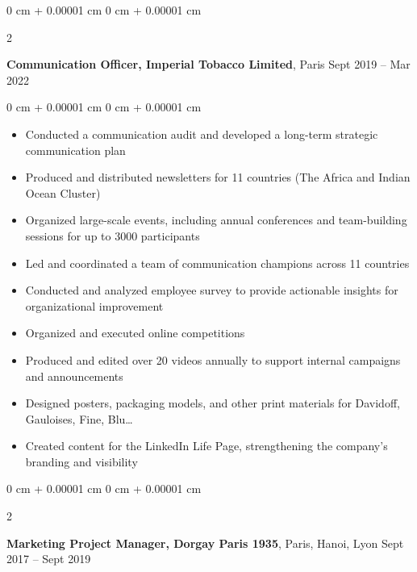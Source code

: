 \documentclass[10pt, letterpaper]{article}
\newenvironment{highlights}{
    \begin{itemize}[
        topsep=0.10 cm,
        parsep=0.10 cm,
        partopsep=0pt,
        itemsep=0pt,
        leftmargin=0 cm + 10pt
    ]
}{
    \end{itemize}
} %
\newenvironment{onecolentry}{
    \begin{adjustwidth}{
        0 cm + 0.00001 cm
    }{
        0 cm + 0.00001 cm
    }
}{
    \end{adjustwidth}
} %
\newenvironment{twocolentry}[2][]{
    \onecolentry
    \def\secondColumn{#2}
    \setcolumnwidth{\fill, 3.5 cm}
    \begin{paracol}{2}
}{
    \switchcolumn \raggedleft \secondColumn
    \end{paracol}
    \endonecolentry
} %
\begin{document}
        \vspace{0.2 cm}


        \begin{twocolentry}{
            Sept 2019 – Mar 2022
        }
            \textbf{Communication Officer, Imperial Tobacco Limited}, Paris\end{twocolentry}

        \vspace{0.10 cm}
        \begin{onecolentry}
            \begin{highlights}
\item Conducted a communication audit and developed a long-term strategic communication plan
\item Produced and distributed newsletters for 11 countries (The Africa and Indian Ocean Cluster)
\item Organized large-scale events, including annual conferences and team-building sessions for up to 3000 participants
\item Led and coordinated a team of communication champions across 11 countries
\item Conducted and analyzed employee survey to provide actionable insights for organizational improvement
\item Organized and executed online competitions
\item Produced and edited over 20 videos annually to support internal campaigns and announcements
\item Designed posters, packaging models, and other print materials for Davidoff, Gauloises, Fine, Blu…
\item Created content for the LinkedIn Life Page, strengthening the company’s branding and visibility
      
            \end{highlights}
        \end{onecolentry}



        \vspace{0.2 cm}


        \begin{twocolentry}{
            Sept 2017 – Sept 2019
        }
            \textbf{Marketing Project Manager, Dorgay Paris 1935}, Paris, Hanoi, Lyon\end{twocolentry}
\end{document}
